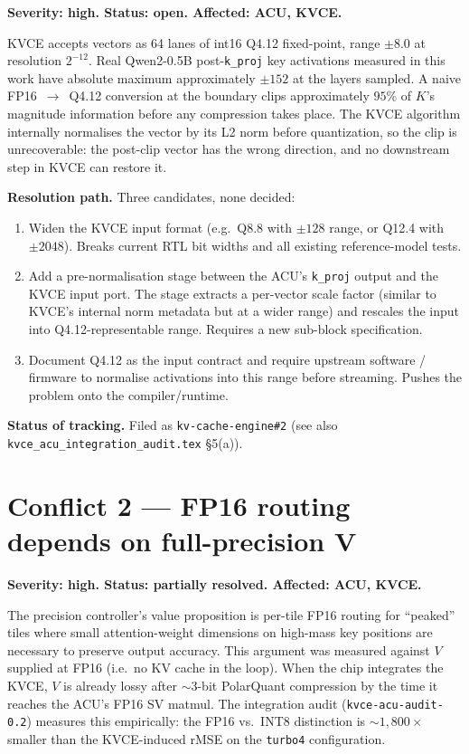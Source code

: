 \documentclass[11pt]{article}
\begin{document}
\textbf{Severity: high. Status: open. Affected: ACU, KVCE.}

KVCE accepts vectors as 64 lanes of int16 Q4.12 fixed-point, range
$\pm 8.0$ at resolution $2^{-12}$. Real Qwen2-0.5B post-\texttt{k\_proj}
key activations measured in this work have absolute maximum
approximately $\pm 152$ at the layers sampled. A naive
FP16~$\rightarrow$~Q4.12 conversion at the boundary clips
approximately $95\%$ of $K$'s magnitude information before any
compression takes place. The KVCE algorithm internally normalises
the vector by its L2 norm before quantization, so the clip is
unrecoverable: the post-clip vector has the wrong direction, and
no downstream step in KVCE can restore it.

\textbf{Resolution path.} Three candidates, none decided:

\begin{enumerate}
\item Widen the KVCE input format (e.g.\ Q8.8 with $\pm 128$ range,
or Q12.4 with $\pm 2048$). Breaks current RTL bit widths and all
existing reference-model tests.
\item Add a pre-normalisation stage between the ACU's
\texttt{k\_proj} output and the KVCE input port. The stage extracts
a per-vector scale factor (similar to KVCE's internal norm metadata
but at a wider range) and rescales the input into Q4.12-representable
range. Requires a new sub-block specification.
\item Document Q4.12 as the input contract and require upstream
software / firmware to normalise activations into this range before
streaming. Pushes the problem onto the compiler/runtime.
\end{enumerate}

\textbf{Status of tracking.} Filed as \texttt{kv-cache-engine\#2}
(see also \texttt{kvce\_acu\_integration\_audit.tex} \S5(a)).

\section{Conflict 2 --- FP16 routing depends on full-precision V}
\label{sec:c2}

\textbf{Severity: high. Status: partially resolved. Affected: ACU, KVCE.}

The precision controller's value proposition is per-tile FP16 routing
for ``peaked'' tiles where small attention-weight dimensions on
high-mass key positions are necessary to preserve output accuracy.
This argument was measured against $V$ supplied at FP16 (i.e.\ no
KV cache in the loop). When the chip integrates the KVCE, $V$ is
already lossy after $\sim$3-bit PolarQuant compression by the time it
reaches the ACU's FP16 SV matmul. The integration audit
(\texttt{kvce-acu-audit-0.2}) measures this empirically: the FP16
vs.\ INT8 distinction is $\sim 1{,}800\times$ smaller than the
KVCE-induced rMSE on the \texttt{turbo4} configuration.
\end{document}
